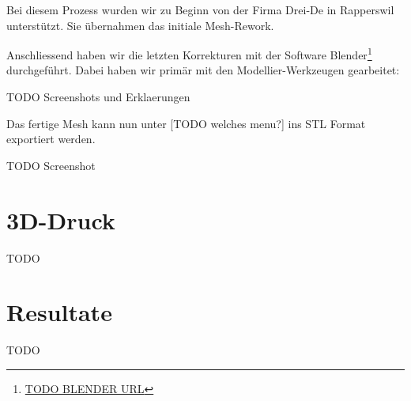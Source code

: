 Bei diesem Prozess wurden wir zu Beginn von der Firma Drei-De in Rapperswil
unterstützt. Sie übernahmen das initiale Mesh-Rework.

Anschliessend haben wir die letzten Korrekturen mit der Software
Blender\footnote{\url{TODO BLENDER URL}} durchgeführt. Dabei haben wir primär
mit den Modellier-Werkzeugen gearbeitet:

TODO Screenshots und Erklaerungen

Das fertige Mesh kann nun unter [TODO welches menu?] ins STL Format exportiert
werden.

TODO Screenshot


\section{3D-Druck}

TODO


\section{Resultate}

TODO
